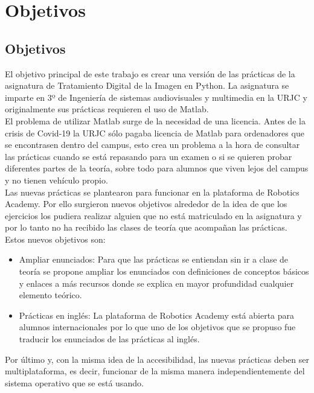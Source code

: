 \chapter{Objetivos}

\section{Objetivos}

El objetivo principal de este trabajo es crear una versión de las prácticas de la asignatura de Tratamiento Digital de la Imagen en Python. La asignatura se imparte en 3º de Ingeniería de sistemas audiovisuales y multimedia en la URJC y originalmente sus prácticas requieren el uso de Matlab. \\

El problema de utilizar Matlab surge de la necesidad de una licencia. Antes de la crisis de Covid-19 la URJC sólo pagaba licencia de Matlab para ordenadores que se encontrasen dentro del campus, esto crea un problema a la hora de consultar las prácticas cuando se está repasando para un examen o si se quieren probar diferentes partes de la teoría, sobre todo para alumnos que viven lejos del campus y no tienen vehículo propio.\\

Las nuevas prácticas se plantearon para funcionar en la plataforma de Robotics Academy. Por ello surgieron nuevos objetivos alrededor de la idea de que los ejercicios los pudiera realizar alguien que no está matriculado en la asignatura y por lo tanto no ha recibido las clases de teoría que acompañan las prácticas. Estos nuevos objetivos son:
\begin{itemize}
    \item Ampliar enunciados: Para que las prácticas se entiendan sin ir a clase de teoría se propone ampliar los enunciados con definiciones de conceptos básicos y enlaces a más recursos donde se explica en mayor profundidad cualquier elemento teórico.
    \item Prácticas en inglés: La plataforma de Robotics Academy está abierta para alumnos internacionales por lo que uno de los objetivos que se propuso fue traducir los enunciados de las prácticas al inglés.
\end{itemize}

Por último y, con la misma idea de la accesibilidad, las nuevas prácticas deben ser multiplataforma, es decir, funcionar de la misma manera independientemente del sistema operativo que se está usando.

